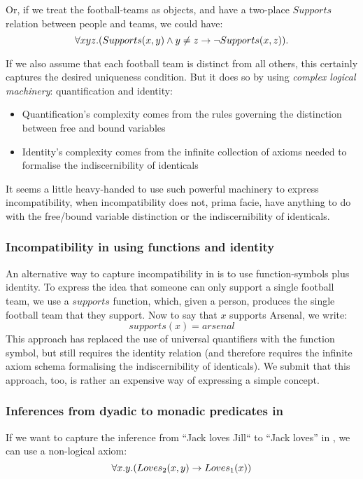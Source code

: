 \NI Or, if we treat the football-teams as objects, and have a
two-place $Supports$ relation between people and teams, we could have:
\[
   \forall x y z . (Supports(x,y) \land y \neq z \rightarrow \neg Supports(x,z)).
\]   

\NI If we also assume that each football team is distinct from all 
others, this certainly captures the desired uniqueness condition.  But
it does so by using \emph{complex logical machinery}: quantification and identity:
\begin{itemize}
\item
Quantification's complexity comes from the rules governing the distinction between free and bound variables
\item
Identity's complexity comes from the infinite collection of axioms needed to formalise the indiscernibility of identicals
\end{itemize}
It seems a little heavy-handed to use such powerful machinery to express incompatibility, when incompatibility does not, prima facie, have anything to do with the free/bound variable distinction or the indiscernibility of identicals.

\subsubsection{Incompatibility in \fol{} using functions and identity}\label{incompatibleusing functions}

An alternative way to capture incompatibility in \fol{} is to use function-symbols plus identity.
To express the idea that someone can only support a single football team, we use a $supports$ function, which, given a person, produces the single football team that they support.
Now to say that $x$ supports Arsenal, we write:
\[
supports(x) = arsenal
\]
This approach has replaced the use of universal quantifiers with the function symbol, but still requires the identity relation (and therefore requires the infinite axiom schema formalising the indiscernibility of identicals). 
We submit that this approach, too, is rather an expensive way of expressing a simple concept.

\subsubsection{Inferences from dyadic to monadic predicates in \fol{}}
If we want to capture the inference from ``Jack loves Jill`` to ``Jack
loves'' in \fol{}, we can use a non-logical axiom:
\[
   \forall x. y .( Loves_2(x,y) \rightarrow Loves_1(x))
\]

